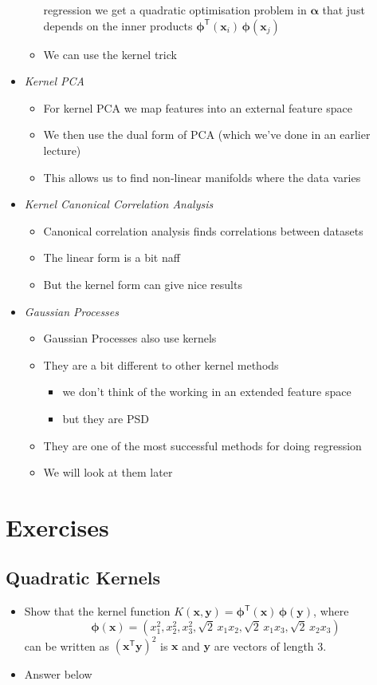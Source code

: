 \documentclass[11pt]{article}
\newcommand{\tr}{\textsf{T}}
\begin{document}
\begin{itemize}
\begin{itemize}
regression we get a quadratic optimisation problem in
\(\bm{\alpha}\) that just depends on the inner products
\(\bm{\phi}^\tr(\bm{x}_i)\,\bm{\phi}(\bm{x}_j)\)
\item We can use the kernel trick
\end{itemize}
\item \emph{Kernel PCA}
\begin{itemize}
\item For kernel PCA we map features into an external feature space
\item We then use the dual form of PCA (which we've done in an
earlier lecture)
\item This allows us to find non-linear manifolds where the data varies
\end{itemize}
\item \emph{Kernel Canonical Correlation Analysis}
\begin{itemize}
\item Canonical correlation analysis finds correlations between datasets
\item The linear form is a bit naff
\item But the kernel form can give nice results
\end{itemize}
\item \emph{Gaussian Processes}
\begin{itemize}
\item Gaussian Processes also use kernels
\item They are a bit different to other kernel methods
\begin{itemize}
\item we don't think of the working in an extended feature space
\item but they are PSD
\end{itemize}
\item They are one of the most successful methods for doing
regression
\item We will look at them later
\end{itemize}
\end{itemize}

\section{Exercises}
\label{sec:org22b82f9}

\subsection{Quadratic Kernels}
\label{sec:org7ee03f3}
\begin{itemize}
\item Show that the kernel function \(K(\bm{x},\bm{y}) =
      \bm{\phi}^\tr(\bm{x}) \,\bm{\phi}(\bm{y})\), where
$$ \bm{\phi}(\bm{x}) = (x_1^2, x_2^2, x_3^2, \sqrt{2}\, x_1 x_2,
      \sqrt{2}\,x_1x_3, \sqrt{2}\,x_2x_3) $$
 can be written as
 \((\bm{x}^\tr\bm{y})^2\) is \(\bm{x}\) and \(\bm{y}\) are vectors of
 length 3.
\item Answer below
\end{itemize}
\end{document}
